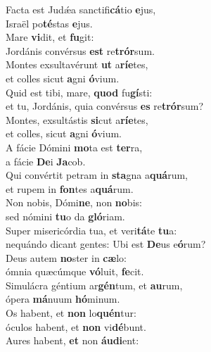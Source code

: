 \evenverse Facta est Judǽa sanctifi\textbf{cá}tio \textbf{e}jus,~\*\\
\evenverse Israël po\textbf{té}stas \textbf{e}jus.\\
\oddverse Mare \textbf{vi}dit, et \textbf{fu}git:~\*\\
\oddverse Jordánis convérsus \textbf{est} re\textbf{trór}sum.\\
\evenverse Montes exsultavérunt \textbf{ut} a\textbf{rí}\textbf{e}tes,~\*\\
\evenverse et colles sicut \textbf{a}gni \textbf{ó}vium.\\
\oddverse Quid est tibi, mare, \textbf{quod} fu\textbf{gí}sti:~\*\\
\oddverse et tu, Jordánis, quia convérsus \textbf{es} re\textbf{trór}sum?\\
\evenverse Montes, exsultástis \textbf{si}cut a\textbf{rí}\textbf{e}tes,~\*\\
\evenverse et colles, sicut \textbf{a}gni \textbf{ó}vium.\\
\oddverse A fácie Dómini \textbf{mo}ta est \textbf{ter}ra,~\*\\
\oddverse a fácie \textbf{De}i \textbf{Ja}cob.\\
\evenverse Qui convértit petram in \textbf{sta}gna a\textbf{quá}rum,~\*\\
\evenverse et rupem in \textbf{fon}tes a\textbf{quá}rum.\\
\oddverse Non nobis, Dómi\textbf{ne}, non \textbf{no}bis:~\*\\
\oddverse sed nómini \textbf{tu}o da \textbf{gló}riam.\\
\evenverse Super misericórdia tua, et veri\textbf{tá}te \textbf{tu}a:~\*\\
\evenverse nequándo dicant gentes: Ubi est \textbf{De}us e\textbf{ó}rum?\\
\oddverse Deus autem \textbf{no}ster in \textbf{cæ}lo:~\*\\
\oddverse ómnia quæcúmque \textbf{vó}luit, \textbf{fe}cit.\\
\evenverse Simulácra géntium ar\textbf{gén}tum, et \textbf{au}rum,~\*\\
\evenverse ópera \textbf{má}nuum \textbf{hó}minum.\\
\oddverse Os habent, et \textbf{non} lo\textbf{quén}tur:~\*\\
\oddverse óculos habent, et \textbf{non} vi\textbf{dé}bunt.\\
\evenverse Aures habent, \textbf{et} non \textbf{áu}\textbf{di}ent:~\*\\
